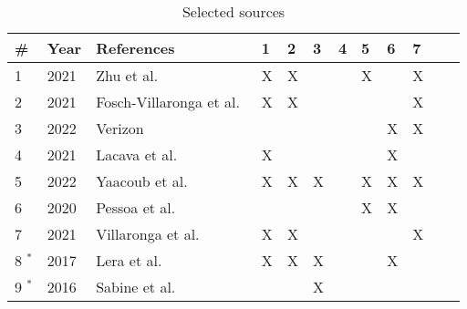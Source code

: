 \begin{table}[h!]
  \centering
  \caption{Selected sources}
  \label{table:selected_sources}
  \begin{tabularx}{\textwidth}{|l|l|X|l|l|l|l|l|l|l|l|l|}
    \hline
    \textbf{\#}  & \textbf{Year} & \textbf{References}                                                         & \textbf{1} & \textbf{2} & \textbf{3} & \textbf{4} & \textbf{5}& \textbf{6}& \textbf{7}  \\\hline
    1            & 2021          & Zhu et al.~\cite[]{introduction_to_robot_system_security_2021}              & X          & X          &            &            & X          &            & X          \\\hline
    2            & 2021          & Fosch-Villaronga et al.~\cite[]{cyber_sec_safet_robots_legal_2021}          & X          & X          &            &            &  &  & X \\\hline
    3            & 2022          & Verizon~\cite[]{dbir_2022}                                                  &            &            &            &            &            & X          & X          \\\hline
    4            & 2021          & Lacava et al.~\cite[]{cyber_security_issues_in_robotics_2021}               & X          &            &            &            &            & X          &            \\\hline
    5            & 2022          & Yaacoub et al.~\cite[]{robotics_cyber_security_2022}                        & X          & X          & X          &            & X          & X          & X          \\\hline
    6            & 2020          & Pessoa et al.~\cite[]{smart_design_engineering_2020}                        &            &            &            &            & X          & X          &            \\\hline
    7            & 2021          & Villaronga et al.~\cite[]{cyber_sec_safety_robots_legal_2021}               & X          & X          &            &            &            &            & X          \\\hline
    8 $^{\ast}$  & 2017          & Lera et al.~\cite[]{cyber_sec_robotics_privacy_safety_2017}                 & X          & X & X &  &  & X &  \\\hline
    9 $^{\ast}$  & 2016          & Sabine et al.~\cite[]{if_robots_cause_harm_2016}                            &            &            & X          &            &            &            &            \\\hline

\end{tabularx}
\end{table}
